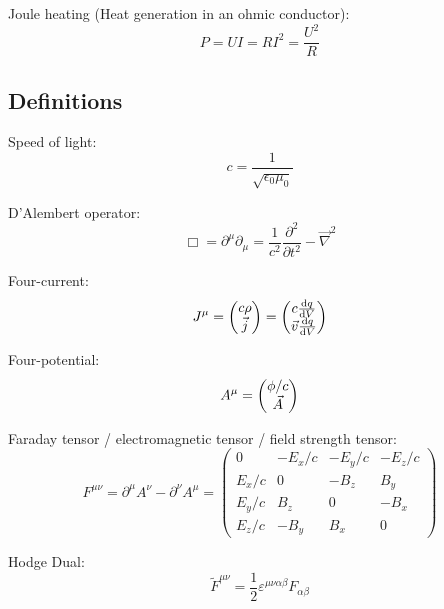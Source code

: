 			\noindent
			Joule heating (Heat generation in an ohmic conductor):
			\begin{equation}
				P = UI = RI^2 = \frac{U^2}{R}
			\end{equation}



	\subsection{Definitions}
		\noindent
		Speed of light:
		\begin{equation}
			c=\frac{1}{\sqrt{\epsilon_0 \mu_0}}
		\end{equation}

		\noindent
		D'Alembert operator:
		\begin{equation}
			\Box = \partial^\mu \partial_\mu = \frac{1}{c^2}\frac{\partial^2}{\partial t^2} - \vec{\nabla}^2
		\end{equation}

		\noindent
		Four-current:
		\begin{equation}
			J^\mu = \left(\begin{matrix}c\rho\\\vec{j}\end{matrix}\right) = \left(\begin{matrix}c\frac{\mathrm{d} q}{\mathrm{d} V}\\\vec{v}\frac{\mathrm{d} q}{\mathrm{d} V}\end{matrix}\right)
		\end{equation}

		\noindent
		Four-potential:
		\begin{equation}
			A^\mu = \left(\begin{matrix}\phi/c\\\vec{A}\end{matrix}\right)
		\end{equation}

		\noindent
		Faraday tensor / electromagnetic tensor / field strength tensor:
		\begin{equation}
			F^{\mu\nu} = \partial^\mu A^\nu - \partial^\nu A^\mu
			= \left( \begin{matrix}
				0 & -E_x/c & -E_y/c & -E_z/c \\
				E_x/c & 0 & -B_z & B_y \\
				E_y/c	& B_z & 0 & -B_x \\
				E_z/c & -B_y & B_x & 0
			\end{matrix} \right)
		\end{equation}

		\noindent
		Hodge Dual:
		\begin{equation}
			\tilde{F}^{\mu\nu} = \frac{1}{2}\varepsilon^{\mu\nu\alpha\beta}F_{\alpha\beta}
		\end{equation}

